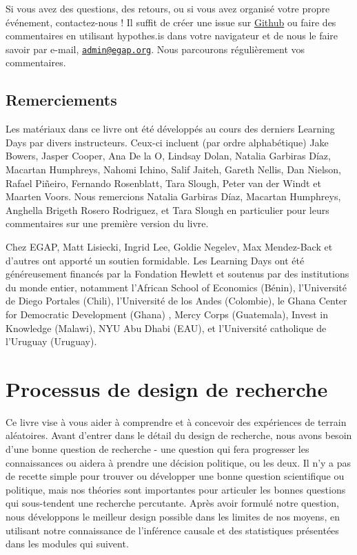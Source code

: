 \documentclass[
  12pt,
]{book}
\begin{document}
Si vous avez des questions, des retours, ou si vous avez organisé votre propre événement, contactez-nous !
Il suffit de créer une issue sur \href{https://github.com/egap/theory_and_practice_of_field_experiments_french/issues}{Github} ou faire des commentaires en utilisant hypothes.is dans votre navigateur et de nous le faire savoir par e-mail, \href{mailto:admin@egap.org}{\nolinkurl{admin@egap.org}}. Nous parcourons régulièrement vos commentaires.

\hypertarget{remerciements}{%
\section{Remerciements}\label{remerciements}}

Les matériaux dans ce livre ont été développés au cours des derniers Learning Days par divers instructeurs.
Ceux-ci incluent (par ordre alphabétique) Jake Bowers, Jasper Cooper, Ana De la O, Lindsay Dolan, Natalia Garbiras Díaz, Macartan Humphreys, Nahomi Ichino, Salif Jaiteh, Gareth Nellis, Dan Nielson, Rafael Piñeiro, Fernando Rosenblatt, Tara Slough, Peter van der Windt et Maarten Voors. Nous remercions Natalia Garbiras Díaz, Macartan Humphreys, Anghella Brigeth Rosero Rodriguez, et Tara Slough en particulier pour leurs commentaires sur une première version du livre.

Chez EGAP, Matt Lisiecki, Ingrid Lee, Goldie Negelev, Max Mendez-Back et d'autres ont apporté un soutien formidable. Les Learning Days ont été généreusement financés par la Fondation Hewlett et soutenus par des institutions du monde entier, notamment l'African School of Economics (Bénin), l'Université de Diego Portales (Chili), l'Université de los Andes (Colombie), le Ghana Center for Democratic Development (Ghana) , Mercy Corps (Guatemala), Invest in Knowledge (Malawi), NYU Abu Dhabi (EAU), et l'Université catholique de l'Uruguay (Uruguay).

\hypertarget{processus-de-design-de-recherche}{%
\chapter{Processus de design de recherche}\label{processus-de-design-de-recherche}}

Ce livre vise à vous aider à comprendre et à concevoir des expériences de terrain aléatoires. Avant d'entrer dans le détail du design de recherche, nous avons besoin d'une bonne question de recherche - une question qui fera progresser les connaissances ou aidera à prendre une décision politique, ou les deux. Il n'y a pas de recette simple pour trouver ou développer une bonne question scientifique ou politique, mais nos théories sont importantes pour articuler les bonnes questions qui sous-tendent une recherche percutante. Après avoir formulé notre question, nous développons le meilleur design possible dans les limites de nos moyens, en utilisant notre connaissance de l'inférence causale et des statistiques présentées dans les modules qui suivent.
\end{document}
